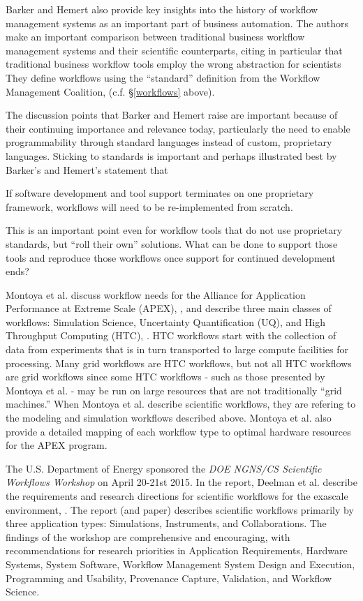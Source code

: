 Barker and Hemert also provide key insights into the history of workflow
management systems as an important part of business automation. The authors make
an important comparison between traditional business workflow management systems
and their scientific counterparts, citing in particular that traditional
business workflow tools employ the wrong abstraction for scientists They define
workflows using the ``standard'' definition from the Workflow Management
Coalition, (c.f. \S \ref{workflows} above).

The discussion points that Barker and Hemert raise are important because of
their continuing importance and relevance today, particularly the need to enable
programmability through standard languages instead of custom, proprietary
languages. Sticking to standards is important and perhaps illustrated best
by Barker's and Hemert's statement that

\begin{displayquote} If software development and tool support terminates on one
proprietary framework, workflows will need to be re-implemented from scratch.
\end{displayquote}

This is an important point even for workflow tools that do not use proprietary
standards, but ``roll their own'' solutions. What can be done to support those
tools and reproduce those workflows once support for continued development ends?

Montoya et al. discuss workflow needs for the Alliance for Application
Performance at Extreme Scale (APEX), \cite{nersc_apex_2016}, and describe three
main classes of workflows: Simulation Science, Uncertainty Quantification (UQ),
and High Throughput Computing (HTC), \cite{montoya_apex_2016}.  HTC workflows
start with the collection of data from experiments that is in turn transported
to large compute facilities for processing. Many grid workflows are HTC
workflows, but not all HTC workflows are grid workflows since some HTC workflows
- such as those presented by Montoya et al. - may be run on large
resources that are not traditionally ``grid machines.'' When Montoya et al.
describe scientific workflows, they are refering to the modeling and simulation
workflows described above. Montoya et al. also provide a detailed mapping of
each workflow type to optimal hardware resources for the APEX program.

The U.S. Department of Energy sponsored the \emph{DOE NGNS/CS Scientific
Workflows Workshop} on April 20-21st 2015. In the report, Deelman et al.
describe the requirements and research directions for scientific workflows for
the exascale environment, \cite{deelman_future_2015}\cite{deelman_future_2017}.
The report (and paper) describes scientific workflows primarily by three
application types: Simulations, Instruments, and Collaborations. The findings of
the workshop are comprehensive and encouraging, with recommendations for
research priorities in Application Requirements, Hardware Systems, System
Software, Workflow Management System Design and Execution, Programming and
Usability, Provenance Capture, Validation, and Workflow Science.


